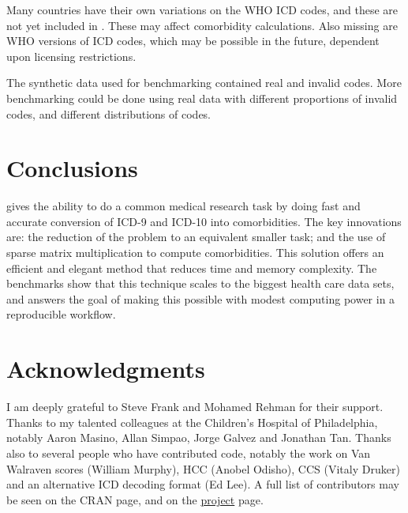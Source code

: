 \documentclass[article]{jss}
\begin{document}
Many countries have their own variations on the WHO ICD codes, and these
are not yet included in . These may affect comorbidity
calculations. Also missing are WHO versions of ICD codes, which may be
possible in the future, dependent upon licensing restrictions.

The synthetic data used for benchmarking contained real and invalid
codes. More benchmarking could be done using real data with different
proportions of invalid codes, and different distributions of codes.

\section{Conclusions}\label{conclusions}

 gives  the ability to do a common medical research
task by doing fast and accurate conversion of ICD-9 and ICD-10 into
comorbidities. The key innovations are: the reduction of the problem to
an equivalent smaller task; and the use of sparse matrix multiplication
to compute comorbidities. This solution offers an efficient and elegant
method that reduces time and memory complexity. The benchmarks show that
this technique scales to the biggest health care data sets, and answers
the goal of making this possible with modest computing power in a
reproducible workflow.

\section*{Acknowledgments}

I am deeply grateful to Steve Frank and Mohamed Rehman for their
support. Thanks to my talented colleagues at the Children's Hospital of
Philadelphia, notably Aaron Masino, Allan Simpao, Jorge Galvez and
Jonathan Tan. Thanks also to several people who have contributed code,
notably the work on Van Walraven scores (William Murphy), HCC (Anobel
Odisho), CCS (Vitaly Druker) and an alternative ICD decoding format (Ed
Lee). A full list of contributors may be seen on the
\href{https://cran.r-project.org/web/packages/icd/index.html}{}
CRAN page, and on the \href{https://jackwasey.github.io/icd/}{project}
page.

\renewcommand\refname{References}

\end{document}
